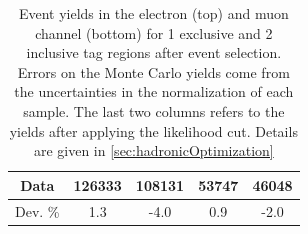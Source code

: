 \begin{table}
\begin{tabular}{c|c|c|c|c}
\hline
Data       	&   126333	            &  108131 	            & 53747      	        &  46048         \\
\hline
Dev. \% 	&	1.3 				& -4.0 					& 0.9 			& -2.0 \\
\hline\hline
\end{tabular}
\caption{Event yields in the electron (top) and muon channel (bottom) for 1 exclusive and 2 inclusive \bt tag regions after event selection. Errors on the Monte Carlo yields come from the uncertainties in the normalization of each sample. The last two columns refers to the yields after applying the likelihood cut. Details are given in \ref{sec:hadronicOptimization}}%
\label{tab:event_yield}
\end{table}


